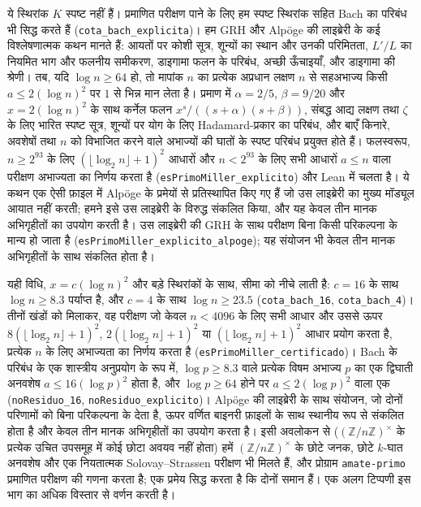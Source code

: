 \documentclass[11pt,a4paper]{amsart}
\theoremstyle{definition}
\theoremstyle{remark}
\begin{document}
ये स्थिरांक $K$ स्पष्ट नहीं हैं। प्रमाणित परीक्षण पाने के लिए हम स्पष्ट स्थिरांक सहित Bach का परिबंध भी सिद्ध करते हैं (\texttt{cota\_bach\_explicita})। हम GRH और Alp\"oge की लाइब्रेरी के कई विश्लेषणात्मक कथन मानते हैं: आयतों पर कोशी सूत्र, शून्यों का स्थान और उनकी परिमितता, $L'/L$ का नियमित भाग और फलनीय समीकरण, डाइगामा फलन के परिबंध, अच्छी ऊँचाइयाँ, और डाइगामा की श्रेणी। तब, यदि $\log n\ge 64$ हो, तो मापांक $n$ का प्रत्येक अप्रधान लक्षण $n$ से सहअभाज्य किसी $a\le 2(\log n)^2$ पर $1$ से भिन्न मान लेता है। प्रमाण में $\alpha=2/5$, $\beta=9/20$ और $x=2(\log n)^2$ के साथ कर्नेल फलन $x^s/((s+\alpha)(s+\beta))$, संबद्ध आद्य लक्षण तथा $\zeta$ के लिए भारित स्पष्ट सूत्र, शून्यों पर योग के लिए Hadamard-प्रकार का परिबंध, और बाएँ किनारे, अवशेषों तथा $n$ को विभाजित करने वाले अभाज्यों की घातों के स्पष्ट परिबंध प्रयुक्त होते हैं। फलस्वरूप, $n\ge 2^{93}$ के लिए $(\lfloor\log_2 n\rfloor+1)^2$ आधारों और $n<2^{93}$ के लिए सभी आधारों $a\le n$ वाला परीक्षण अभाज्यता का निर्णय करता है (\texttt{esPrimoMiller\_explicito}) और Lean में चलता है। ये कथन एक ऐसी फ़ाइल में Alp\"oge के प्रमेयों से प्रतिस्थापित किए गए हैं जो उस लाइब्रेरी का मुख्य मॉड्यूल आयात नहीं करती; हमने इसे उस लाइब्रेरी के विरुद्ध संकलित किया, और यह केवल तीन मानक अभिगृहीतों का उपयोग करती है। उस लाइब्रेरी की GRH के साथ परीक्षण बिना किसी परिकल्पना के मान्य हो जाता है (\texttt{esPrimoMiller\_explicito\_alpoge}); यह संयोजन भी केवल तीन मानक अभिगृहीतों के साथ संकलित होता है।

यही विधि, $x=c(\log n)^2$ और बड़े स्थिरांकों के साथ, सीमा को नीचे लाती है: $c=16$ के साथ $\log n\ge 8.3$ पर्याप्त है, और $c=4$ के साथ $\log n\ge 23.5$ (\texttt{cota\_bach\_16}, \texttt{cota\_bach\_4})। तीनों खंडों को मिलाकर, वह परीक्षण जो केवल $n<4096$ के लिए सभी आधार और उससे ऊपर $8(\lfloor\log_2 n\rfloor+1)^2$, $2(\lfloor\log_2 n\rfloor+1)^2$ या $(\lfloor\log_2 n\rfloor+1)^2$ आधार प्रयोग करता है, प्रत्येक $n$ के लिए अभाज्यता का निर्णय करता है (\texttt{esPrimoMiller\_certificado})। Bach के परिबंध के एक शास्त्रीय अनुप्रयोग के रूप में, $\log p\ge 8.3$ वाले प्रत्येक विषम अभाज्य $p$ का एक द्विघाती अनवशेष $a\le 16(\log p)^2$ होता है, और $\log p\ge 64$ होने पर $a\le 2(\log p)^2$ वाला एक (\texttt{noResiduo\_16}, \texttt{noResiduo\_explicito})। Alp\"oge की लाइब्रेरी के साथ संयोजन, जो दोनों परिणामों को बिना परिकल्पना के देता है, ऊपर वर्णित बाइनरी फ़ाइलों के साथ स्थानीय रूप से संकलित होता है और केवल तीन मानक अभिगृहीतों का उपयोग करता है। इसी अवलोकन से ($(\mathbb Z/n\mathbb Z)^\times$ के प्रत्येक उचित उपसमूह में कोई छोटा अवयव नहीं होता) हमें $(\mathbb Z/n\mathbb Z)^\times$ के छोटे जनक, छोटे $k$-घात अनवशेष और एक नियतात्मक Solovay--Strassen परीक्षण भी मिलते हैं, और प्रोग्राम \texttt{amate-primo} प्रमाणित परीक्षण की गणना करता है; एक प्रमेय सिद्ध करता है कि दोनों समान हैं। एक अलग टिप्पणी इस भाग का अधिक विस्तार से वर्णन करती है।
\end{document}

